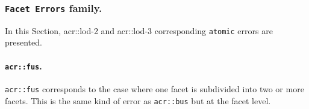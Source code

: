         \subsubsection{\texttt{Facet Errors} family.}
            In this Section, \gls{acr::lod}-2 and \gls{acr::lod}-3 corresponding \texttt{atomic} errors are presented.

            \paragraph{\texttt{\acrlong*{acr::fus}}.}
                \texttt{\gls{acr::fus}} corresponds to the case where one facet is subdivided into two or more facets.
                This is the same kind of error as \texttt{\gls{acr::bus}} but at the facet level.\\

